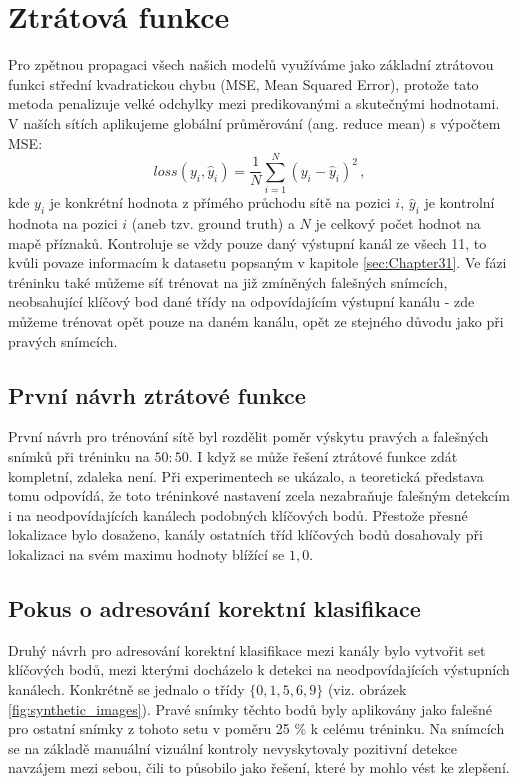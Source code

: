 \section{Ztrátová funkce}
\label{sec:Chapter47}
Pro zpětnou propagaci všech našich modelů využíváme jako základní ztrátovou funkci střední kvadratickou chybu (MSE, Mean Squared Error), protože tato metoda penalizuje velké odchylky mezi predikovanými a skutečnými hodnotami.  V naších sítích aplikujeme globální průměrování (ang. reduce mean) s výpočtem MSE:
\begin{equation}
    loss(y_i, \hat{y}_i) = \frac{1}{N} \sum_{i=1}^{N} (y_i - \hat{y}_i)^2 \,,
\end{equation}
kde $y_i$ je konkrétní hodnota z přímého průchodu sítě na pozici $i$, $\hat{y}_i$ je kontrolní hodnota na pozici $i$ (aneb tzv. ground truth) a $N$ je celkový počet hodnot na mapě příznaků. Kontroluje se vždy pouze daný výstupní kanál ze všech 11, to kvůli povaze informacím k datasetu popsaným v kapitole \ref{sec:Chapter31}. Ve fázi tréninku také můžeme síť trénovat na již zmíněných falešných snímcích, neobsahující klíčový bod dané třídy na odpovídajícím výstupní kanálu - zde můžeme trénovat opět pouze na daném kanálu, opět ze stejného důvodu jako při pravých snímcích.

\subsection{První návrh ztrátové funkce}

První návrh pro trénování sítě byl rozdělit poměr výskytu pravých a falešných snímků při tréninku na $50:50$. I když se může řešení ztrátové funkce zdát kompletní, zdaleka není. Při experimentech se ukázalo, a teoretická představa tomu odpovídá, že toto tréninkové nastavení zcela nezabraňuje falešným detekcím i na neodpovídajících kanálech podobných klíčových bodů. Přestože přesné lokalizace bylo dosaženo, kanály ostatních tříd klíčových bodů dosahovaly při lokalizaci na svém maximu hodnoty blížící se $1,0$.

\subsection{Pokus o adresování korektní klasifikace}

Druhý návrh pro adresování korektní klasifikace mezi kanály bylo vytvořit set klíčových bodů, mezi kterými docházelo k detekci na neodpovídajících výstupních kanálech. Konkrétně se jednalo o třídy $\{0, 1, 5, 6, 9\}$ (viz. obrázek \ref{fig:synthetic_images}). Pravé snímky těchto bodů byly aplikovány jako falešné pro ostatní snímky z tohoto setu v poměru 25 \% k celému tréninku. Na snímcích se na základě manuální vizuální kontroly nevyskytovaly pozitivní detekce navzájem mezi sebou, čili to působilo jako řešení, které by mohlo vést ke zlepšení.


